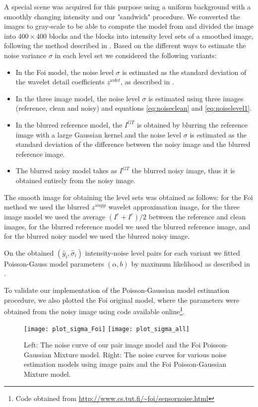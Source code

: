 \documentclass[review]{elsarticle}
\begin{document}
A special scene was acquired for this purpose using a uniform background with a smoothly changing intensity and our "sandwich" procedure. We converted the images to gray-scale to be able to compute the model from \cite{Foi-Poisson} and divided the image into $400\times 400$ blocks and the blocks into intensity level sets of a smoothed image, following the method described in \cite{Foi-Poisson}. Based on the different ways to estimate the noise variance $\sigma$ in each level set 
we considered the following variants:
\begin{itemize}
\item In the Foi model, the noise level $\sigma$ is estimated as the standard deviation of the wavelet detail coefficients $z^{wdet}$, as described in \cite{Foi-Poisson}.
\item In the three image model, the noise level $\sigma$ is estimated using three images (reference, clean and noisy) and equations \eqref{eq:noiseclean} and \eqref{eq:noiselevel1}. 
\item In the blurred reference model, the $I^{GT}$ is obtained by blurring the reference image with a large Gaussian kernel and the noise level $\sigma$ is estimated as the standard deviation of the difference between the noisy image and the blurred reference image. 
\item The blurred noisy model takes as $I^{GT}$ the blurred noisy image, thus it is obtained entirely from the noisy image.
\end{itemize}
The smooth image for obtaining the level sets was obtained as follows: for the Foi method we used the blurred $z^{wapp}$ wavelet approximation image, for the three image model we used the average $(I^r+I^c)/2$ between the reference and clean images, for the blurred reference model we used the blurred reference image, and for the blurred noisy model we used the blurred noisy image.

On the obtained $(\hat y_i,\hat \sigma_i)$ intensity-noise level pairs for each variant we fitted Poisson-Gauss model parameters $(\alpha,b)$ by maximum likelihood as described in  \cite{Foi-Poisson}.

To validate our implementation of the Poisson-Gaussian model estimation procedure, we also plotted the Foi original model, where the parameters were obtained from the noisy image using code available online\footnote{Code obtained from \url{http://www.cs.tut.fi/~foi/sensornoise.html}}.
\begin{figure*}[t]
\centering
\texttt{[image: plot\_sigma\_Foi]}
\texttt{[image: plot\_sigma\_all]}
\vskip -5mm
\caption{Left: The noise curve of our pair image model and the Foi Poisson-Gaussian Mixture model. Right: The noise curves for various noise estimation models using image pairs and the Foi Poisson-Gaussian Mixture model.}\label{fig:sigmaplots}
\vspace{-3mm}
\end{figure*}
\end{document}
